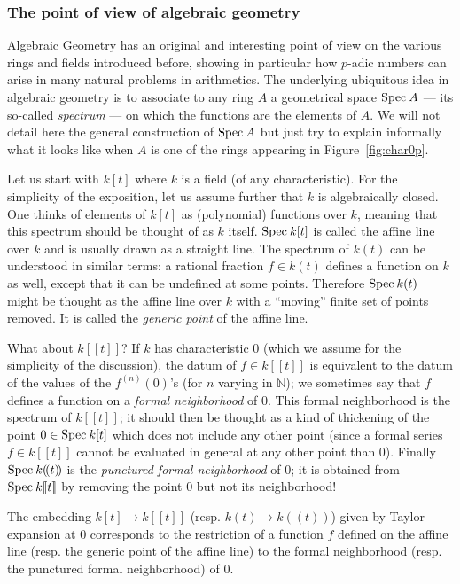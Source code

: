\documentclass[11pt]{article}
\numberwithin{equation}{section}
\numberwithin{figure}{section}
\theoremstyle{definition}
\newcommand{\N}{\mathbb N}
\newcommand{\spec}{\text{\rm Spec}\:}
\begin{document}
\subsubsection{The point of view of algebraic geometry}

Algebraic Geometry has an original and interesting point of view 
on the various rings and fields introduced before, showing in 
particular how $p$-adic numbers can arise in many natural problems in 
arithmetics. The underlying ubiquitous idea in algebraic geometry is
to associate to any ring $A$ a geometrical space $\spec A$ --- its 
so-called \emph{spectrum} --- on which the functions are the elements
of $A$. We will not detail here the general construction of $\spec A$
but just try to explain informally what it looks like when $A$ is 
one of the rings appearing in Figure~\ref{fig:char0p}.

Let us start with $k[t]$ where $k$ is a field (of any characteristic). 
For the simplicity of the exposition, let us assume further that $k$ is 
algebraically closed.
One thinks of elements of $k[t]$ as (polynomial) functions over $k$, 
meaning that this spectrum should be thought of as $k$ itself. $\spec 
k[t]$ is called the affine line over $k$ and is usually drawn as a 
straight line. The spectrum of $k(t)$ can be understood in similar 
terms: a rational fraction $f \in k(t)$ defines a function on $k$ as 
well, except that it can be undefined at some points. Therefore $\spec 
k(t)$ might be thought as the affine line over $k$ with a ``moving'' 
finite set of points removed. It is called the \emph{generic point} of 
the affine line.

What about $k[\![t]\!]$? If $k$ has characteristic $0$ (which we assume 
for the simplicity of the discussion), the datum of $f \in k[\![t]\!]$ 
is equivalent to the datum of the values of the $f^{(n)}(0)$'s (for $n$ 
varying in $\N$); we sometimes say that $f$ defines a function on a 
\emph{formal neighborhood} of $0$. This formal neighborhood is the 
spectrum of $k[\![t]\!]$; it should then be thought as a kind of 
thickening of the point $0 \in \spec k[t]$ which does not include any 
other point (since a formal series $f \in k[\![t]\!]$ cannot be 
evaluated in general at any other point than $0$). 
Finally $\spec k(\!(t)\!)$ is the \emph{punctured formal neighborhood} 
of $0$; it is obtained from $\spec k[\![t]\!]$ by removing the point
$0$ but not its neighborhood!

The embedding $k[t] \to k[\![t]\!]$ (resp. $k(t) \to k(\!(t)\!)$) given 
by Taylor expansion at $0$ corresponds to the restriction of a function 
$f$ defined on the affine line (resp. the generic point of the affine 
line) to the formal neighborhood (resp. the punctured formal 
neighborhood) of $0$.
\end{document}
